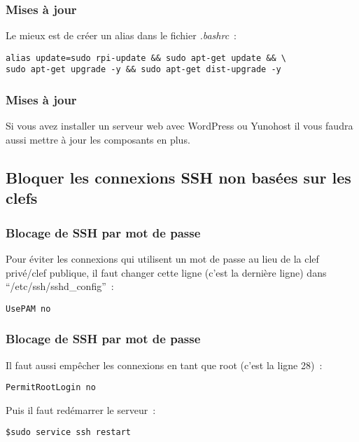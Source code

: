 \begin{frame}[containsverbatim]
\frametitle{Mises à jour}

Le mieux est de créer un alias dans le fichier \emph{.bashrc}~:
\begin{verbatim}
alias update=sudo rpi-update && sudo apt-get update && \
sudo apt-get upgrade -y && sudo apt-get dist-upgrade -y 
\end{verbatim}

\end{frame}

\begin{frame}[containsverbatim]
\frametitle{Mises à jour}

Si vous avez installer un serveur web avec WordPress ou Yunohost il vous faudra aussi mettre à jour les composants en plus.

\end{frame}

\subsection{Bloquer les connexions SSH non basées sur les clefs}

\begin{frame}[containsverbatim]
\frametitle{Blocage de SSH par mot de passe}

Pour éviter les connexions qui utilisent un mot de passe au lieu de la clef privé/clef publique, il faut changer cette ligne (c'est la dernière ligne) dans ``/etc/ssh/sshd\_config''~:

\begin{verbatim}
UsePAM no
\end{verbatim}

\end{frame}

\begin{frame}[containsverbatim]
\frametitle{Blocage de SSH par mot de passe}

Il faut aussi empêcher les connexions en tant que root (c'est la ligne 28)~:
\begin{verbatim}
PermitRootLogin no
\end{verbatim}

Puis il faut redémarrer le serveur~:

\begin{verbatim}
$sudo service ssh restart
\end{verbatim}

\end{frame}
